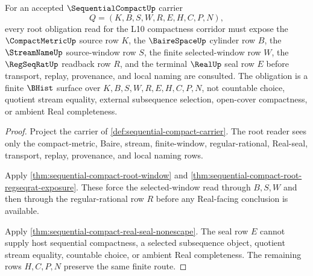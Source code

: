 \begin{theorem}
\label{thm:sequentialcompact-root-obligation-surface}
For an accepted $\SequentialCompactUp$ carrier
$$
Q=(K,B,S,W,R,E,H,C,P,N),
$$
every root obligation read for the L10 compactness corridor must expose the $\CompactMetricUp$ source row $K$, the $\BaireSpaceUp$ cylinder row $B$, the $\StreamNameUp$ source-window row $S$, the finite selected-window row $W$, the $\RegSeqRatUp$ readback row $R$, and the terminal $\RealUp$ seal row $E$ before transport, replay, provenance, and local naming are consulted. The obligation is a finite $\BHist$ surface over $K,B,S,W,R,E,H,C,P,N$, not countable choice, quotient stream equality, external subsequence selection, open-cover compactness, or ambient Real completeness.
\end{theorem}
\begin{proof}
Project the carrier of \autoref{def:sequential-compact-carrier}. The root reader sees only the compact-metric, Baire, stream, finite-window, regular-rational, Real-seal, transport, replay, provenance, and local naming rows.

Apply \autoref{thm:sequential-compact-root-window} and \autoref{thm:sequential-compact-root-regseqrat-exposure}. These force the selected-window read through $B,S,W$ and then through the regular-rational row $R$ before any Real-facing conclusion is available.

Apply \autoref{thm:sequential-compact-real-seal-nonescape}. The seal row $E$ cannot supply host sequential compactness, a selected subsequence object, quotient stream equality, countable choice, or ambient Real completeness. The remaining rows $H,C,P,N$ preserve the same finite route.
\end{proof}

